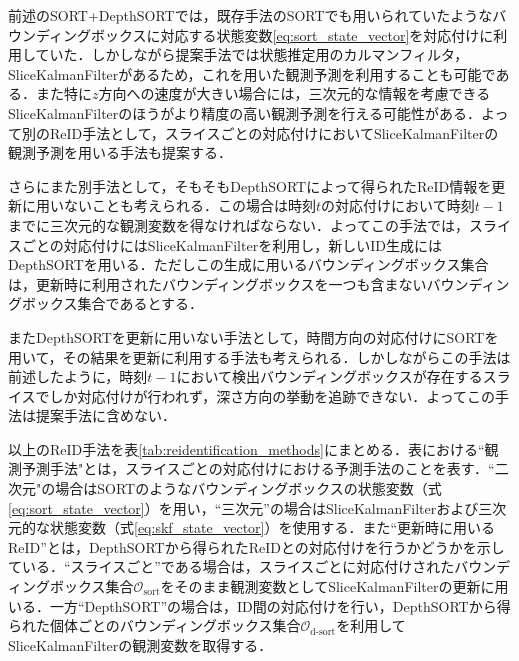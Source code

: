         前述のSORT+DepthSORTでは，既存手法のSORTでも用いられていたようなバウンディングボックスに対応する状態変数\ref{eq:sort_state_vector}を対応付けに利用していた．しかしながら提案手法では状態推定用のカルマンフィルタ，SliceKalmanFilterがあるため，これを用いた観測予測を利用することも可能である．また特に$z$方向への速度が大きい場合には，三次元的な情報を考慮できるSliceKalmanFilterのほうがより精度の高い観測予測を行える可能性がある．よって別のReID手法として，スライスごとの対応付けにおいてSliceKalmanFilterの観測予測を用いる手法も提案する．
        
        さらにまた別手法として，そもそもDepthSORTによって得られたReID情報を更新に用いないことも考えられる．この場合は時刻$t$の対応付けにおいて時刻$t-1$までに三次元的な観測変数を得なければならない．よってこの手法では，スライスごとの対応付けにはSliceKalmanFilterを利用し，新しいID生成にはDepthSORTを用いる．ただしこの生成に用いるバウンディングボックス集合は，更新時に利用されたバウンディングボックスを一つも含まないバウンディングボックス集合であるとする．

        またDepthSORTを更新に用いない手法として，時間方向の対応付けにSORTを用いて，その結果を更新に利用する手法も考えられる．しかしながらこの手法は前述したように，時刻$t-1$において検出バウンディングボックスが存在するスライスでしか対応付けが行われず，深さ方向の挙動を追跡できない．よってこの手法は提案手法に含めない．

        以上のReID手法を表\ref{tab:reidentification_methods}にまとめる．表における``観測予測手法"とは，スライスごとの対応付けにおける予測手法のことを表す．``二次元"の場合はSORTのようなバウンディングボックスの状態変数（式\ref{eq:sort_state_vector}）を用い，``三次元''の場合はSliceKalmanFilterおよび三次元的な状態変数（式\ref{eq:skf_state_vector}）を使用する．また``更新時に用いるReID''とは，DepthSORTから得られたReIDとの対応付けを行うかどうかを示している．``スライスごと''である場合は，スライスごとに対応付けされたバウンディングボックス集合$\mathcal{O}_{\text{sort}}$をそのまま観測変数としてSliceKalmanFilterの更新に用いる．一方``DepthSORT''の場合は，ID間の対応付けを行い，DepthSORTから得られた個体ごとのバウンディングボックス集合$\mathcal{O}_{\text{d-sort}}$を利用してSliceKalmanFilterの観測変数を取得する．